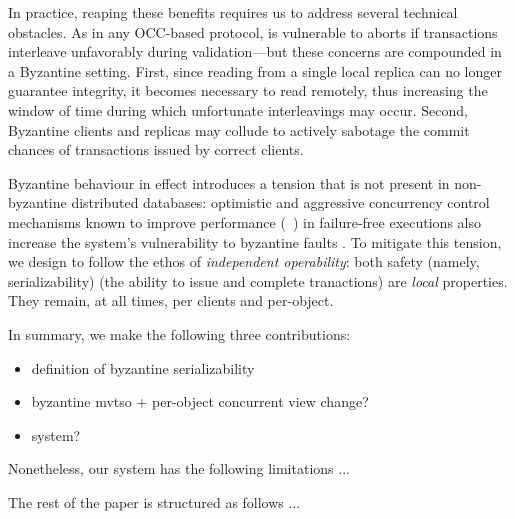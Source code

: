 In practice, reaping these benefits requires us to address several
technical obstacles. As in any OCC-based protocol, \sys
is vulnerable to aborts if transactions interleave unfavorably during
validation---but these concerns are compounded in a Byzantine
setting. First, since reading from a single local replica can no
longer guarantee integrity, it becomes necessary to read remotely,
thus increasing the window of time during which unfortunate
interleavings may occur. Second, Byzantine clients and replicas may
collude to actively sabotage the commit chances of transactions issued
by correct clients. 

Byzantine behaviour in effect introduces a tension that is not present in non-byzantine
distributed databases: optimistic and aggressive concurrency control mechanisms known
to improve performance (~\cite{occ,mvtso,pipeline,tapir}) in failure-free executions also increase the system's vulnerability to byzantine faults . To mitigate this tension, we design \sys{} to follow the ethos of \textit{independent operability}: both safety (namely, serializability) (the ability to issue and complete tranactions)
are \textit{local} properties. They remain, at all times, per clients and per-object.
 

In summary, we make the following three contributions: 
\begin{itemize}
\item definition of byzantine serializability
\item  byzantine mvtso + per-object concurrent view change?
\item system?
\end{itemize}

Nonetheless, our system has the following limitations ...

The rest of the paper is structured as follows ...

